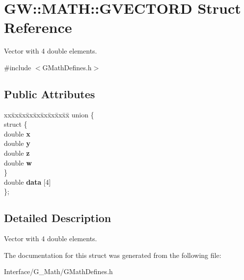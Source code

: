 \hypertarget{structGW_1_1MATH_1_1GVECTORD}{}\section{GW\+:\+:M\+A\+TH\+:\+:G\+V\+E\+C\+T\+O\+RD Struct Reference}
\label{structGW_1_1MATH_1_1GVECTORD}


Vector with 4 double elements.  




{\ttfamily \#include $<$G\+Math\+Defines.\+h$>$}

\subsection*{Public Attributes}
\begin{DoxyCompactItemize}
\item 
\mbox{\label{structGW_1_1MATH_1_1GVECTORD_a16fd4343a1d6a83698bc6bfaa968fd5f}} 
\begin{tabbing}
xx\=xx\=xx\=xx\=xx\=xx\=xx\=xx\=xx\=\kill
union \{\\
\mbox{\label{unionGW_1_1MATH_1_1GVECTORD_1_1_0D8_a17a8f0ae8f4361d5e49a0b49c723ba55}} 
\>struct \{\\
\>\>double {\bfseries x}\\
\>\>double {\bfseries y}\\
\>\>double {\bfseries z}\\
\>\>double {\bfseries w}\\
\>\} \\
\>double {\bfseries data} \mbox{[}4\mbox{]}\\
\}; \\

\end{tabbing}\end{DoxyCompactItemize}


\subsection{Detailed Description}
Vector with 4 double elements. 

The documentation for this struct was generated from the following file\+:\begin{DoxyCompactItemize}
\item 
Interface/\+G\+\_\+\+Math/G\+Math\+Defines.\+h\end{DoxyCompactItemize}
